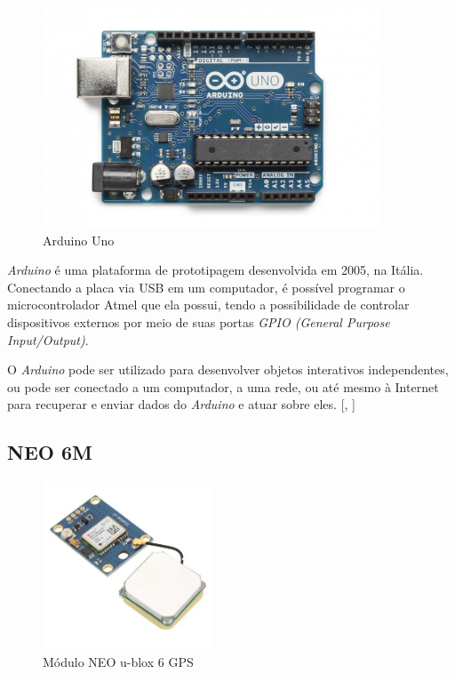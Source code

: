 \documentclass[
	12pt,				%
	oneside,			%
	a4paper,			%
	brazil				%
]{abntex2}
\newcommand{\citecustom}[1]{[\citeauthoronline{#1}, \citeyear{#1}]}
\begin{document}
{\begin{figure}[!h]
\centering
\includegraphics[width=10cm, center]{images/arduino}
\caption{Arduino Uno}
\label{Rotulo}
\end{figure}

\textit{Arduino} é uma plataforma de prototipagem desenvolvida em 2005, na Itália. Conectando a placa via USB em um computador, é possível programar o microcontrolador Atmel que ela possui, tendo a possibilidade de controlar dispositivos externos por meio de suas portas \textit{GPIO (General Purpose Input/Output)}.

O \textit{Arduino} pode ser utilizado para desenvolver objetos interativos independentes, ou pode ser conectado a um computador, a uma rede, ou até mesmo à Internet para recuperar e enviar dados do \textit{Arduino} e atuar sobre eles. \citecustom{mcroberts2011}

\newpage

\subsection{NEO 6M}

\begin{figure}[H]
\centering
\includegraphics[width=5cm, center]{images/neo-6m}
\caption{Módulo NEO u-blox 6 GPS}
\label{Rotulo}
\end{figure}

}
\end{document}
